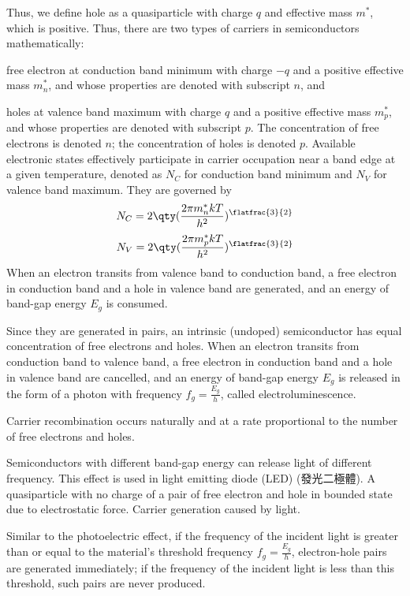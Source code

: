 \documentclass[a4paper,12pt]{article}
\begin{document}
Thus, we define hole as a quasiparticle with charge $q$ and effective mass $m^*$, which is positive.
Thus, there are two types of carriers in semiconductors mathematically:
\bit
\item free electron at conduction band minimum with charge $-q$ and a positive effective mass $m_n^*$, and whose properties are denoted with subscript $n$, and
\item holes at valence band maximum with charge $q$ and a positive effective mass $m_p^*$, and whose properties are denoted with subscript $p$.
\eit
The concentration of free electrons is denoted $n$; the concentration of holes is denoted $p$.
Available electronic states effectively participate in carrier occupation near a band edge at a given temperature, denoted as $N_C$ for conduction band minimum and $N_V$ for valence band maximum. They are governed by
\[N_C=2\qty(\frac{2\pi m_n^*kT}{h^2})^{\flatfrac{3}{2}}\]
\[N_V=2\qty(\frac{2\pi m_p^*kT}{h^2})^{\flatfrac{3}{2}}\]
When an electron transits from valence band to conduction band, a free electron in conduction band and a hole in valence band are generated, and an energy of band-gap energy $E_g$ is consumed.

Since they are generated in pairs, an intrinsic (undoped) semiconductor has equal concentration of free electrons and holes.
When an electron transits from conduction band to valence band, a free electron in conduction band and a hole in valence band are cancelled, and an energy of band-gap energy $E_g$ is released in the form of a photon with frequency $f_g=\frac{E_g}{h}$, called electroluminescence.

Carrier recombination occurs naturally and at a rate proportional to the number of free electrons and holes.

Semiconductors with different band-gap energy can release light of different frequency. This effect is used in light emitting diode (LED) (發光二極體).
A quasiparticle with no charge of a pair of free electron and hole in bounded state due to electrostatic force.
Carrier generation caused by light.

Similar to the photoelectric effect, if the frequency of the incident light is greater than or equal to the material's threshold frequency $f_g=\frac{E_g}{h}$, electron-hole pairs are generated immediately; if the frequency of the incident light is less than this threshold, such pairs are never produced.
\end{document}
